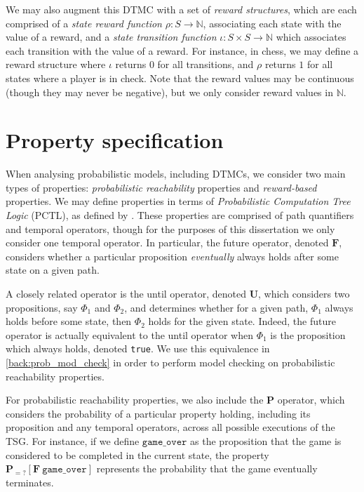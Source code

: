 We may also augment this DTMC with a set of \emph{reward structures}, which are each comprised of a \emph{state reward function} $\rho : S \rightarrow \mathbb{N}$, associating each state with the value of a reward, and a \emph{state transition function} $\iota : S \times S \rightarrow \mathbb{N}$ which associates each transition with the value of a reward. For instance, in chess, we may define a reward structure where $\iota$ returns $0$ for all transitions, and $\rho$ returns $1$ for all states where a player is in check. Note that the reward values may be continuous (though they may never be negative), but we only consider reward values in $\mathbb{N}$.

\section{Property specification}
\label{back:prop_spec}

When analysing probabilistic models, including DTMCs, we consider two main types of properties: \emph{probabilistic reachability} properties and \emph{reward-based} properties. We may define properties in terms of \emph{Probabilistic Computation Tree Logic} (PCTL), as defined by \cite{hansson_logic_1994}. These properties are comprised of path quantifiers and temporal operators, though for the purposes of this dissertation we only consider one temporal operator. In particular, the future operator, denoted $\mathbf{F}$, considers whether a particular proposition \emph{eventually} always holds after some state on a given path.

A closely related operator is the until operator, denoted  $\mathbf{U}$, which considers two propositions, say $\Phi_1$ and $\Phi_2$, and determines whether for a given path, $\Phi_1$ always holds before some state, then $\Phi_2$ holds for the given state. Indeed, the future operator is actually equivalent to the until operator when $\Phi_1$ is the proposition which always holds, denoted \verb+true+. We use this equivalence in \ref{back:prob_mod_check} in order to perform model checking on probabilistic reachability properties.

For probabilistic reachability properties, we also include the $\mathbf{P}$ operator, which considers the probability of a particular property holding, including its proposition and any temporal operators, across all possible executions of the TSG. For instance, if we define $\mathtt{game\_over}$ as the proposition that the game is considered to be completed in the current state, the property $\mathbf{P}_{=?} [\mathbf{F}\ \mathtt{game\_over}]$ represents the probability that the game eventually terminates.

